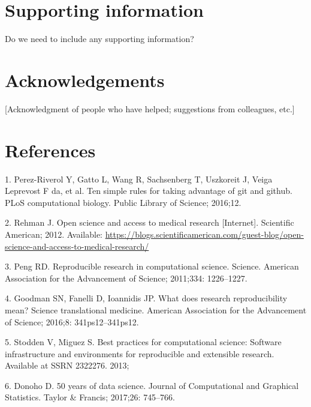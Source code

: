 \documentclass[10pt,letterpaper]{article}
\begin{document}
\hypertarget{supporting-information}{%
\section{Supporting information}\label{supporting-information}}

Do we need to include any supporting information?

\hypertarget{acknowledgements}{%
\section{Acknowledgements}\label{acknowledgements}}

{[}Acknowledgment of people who have helped; suggestions from
colleagues, etc.{]}

\hypertarget{references}{%
\section*{References}\label{references}}

\hypertarget{refs}{}
\leavevmode\hypertarget{ref-perez2016}{}%
1. Perez-Riverol Y, Gatto L, Wang R, Sachsenberg T, Uszkoreit J, Veiga
Leprevost F da, et al. Ten simple rules for taking advantage of git and
github. PLoS computational biology. Public Library of Science; 2016;12.

\leavevmode\hypertarget{ref-rehman2012}{}%
2. Rehman J. Open science and access to medical research {[}Internet{]}.
Scientific American; 2012. Available:
\url{https://blogs.scientificamerican.com/guest-blog/open-science-and-access-to-medical-research/}

\leavevmode\hypertarget{ref-peng2011}{}%
3. Peng RD. Reproducible research in computational science. Science.
American Association for the Advancement of Science; 2011;334:
1226--1227.

\leavevmode\hypertarget{ref-goodman2016}{}%
4. Goodman SN, Fanelli D, Ioannidis JP. What does research
reproducibility mean? Science translational medicine. American
Association for the Advancement of Science; 2016;8: 341ps12--341ps12.

\leavevmode\hypertarget{ref-stodden2013}{}%
5. Stodden V, Miguez S. Best practices for computational science:
Software infrastructure and environments for reproducible and extensible
research. Available at SSRN 2322276. 2013;

\leavevmode\hypertarget{ref-donoho2017}{}%
6. Donoho D. 50 years of data science. Journal of Computational and
Graphical Statistics. Taylor \& Francis; 2017;26: 745--766.
\end{document}
